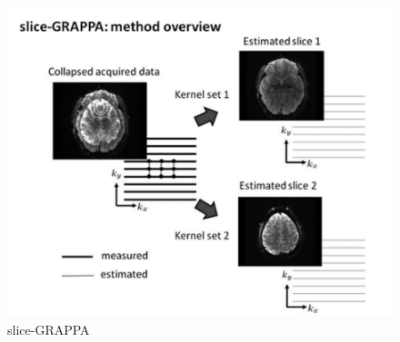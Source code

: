 \documentclass[UTF8]{article}
\begin{document}
\begin{figure}[ht]
	\centering
	\includegraphics[scale=0.75]{./image/4.jpg}
	\caption{slice-GRAPPA}
\end{figure}
\newpage


	
\end{document}
